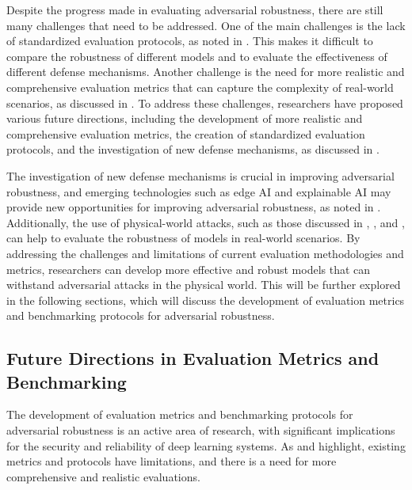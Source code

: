 \documentclass[11pt,a4paper]{article}
\begin{document}
Despite the progress made in evaluating adversarial robustness, there are still many challenges that need to be addressed. One of the main challenges is the lack of standardized evaluation protocols, as noted in \cite{doi:10.1007/978-3-030-58589-1_3}. This makes it difficult to compare the robustness of different models and to evaluate the effectiveness of different defense mechanisms. Another challenge is the need for more realistic and comprehensive evaluation metrics that can capture the complexity of real-world scenarios, as discussed in \cite{doi:10.1609/aaai.v35i2.16211}. To address these challenges, researchers have proposed various future directions, including the development of more realistic and comprehensive evaluation metrics, the creation of standardized evaluation protocols, and the investigation of new defense mechanisms, as discussed in \cite{arxiv:2007.04137}.

The investigation of new defense mechanisms is crucial in improving adversarial robustness, and emerging technologies such as edge AI and explainable AI may provide new opportunities for improving adversarial robustness, as noted in \cite{doi:10.1109/asp-dac47756.2020.9045584}. Additionally, the use of physical-world attacks, such as those discussed in \cite{doi:10.1109/lra.2022.3189783}, \cite{arxiv:2210.15291}, and \cite{doi:10.1109/vr51125.2022.00073}, can help to evaluate the robustness of models in real-world scenarios. By addressing the challenges and limitations of current evaluation methodologies and metrics, researchers can develop more effective and robust models that can withstand adversarial attacks in the physical world. This will be further explored in the following sections, which will discuss the development of evaluation metrics and benchmarking protocols for adversarial robustness.


\subsection{Future Directions in Evaluation Metrics and Benchmarking}


The development of evaluation metrics and benchmarking protocols for adversarial robustness is an active area of research, with significant implications for the security and reliability of deep learning systems. As \cite{doi:10.1145/3128572.3140444} and \cite{arxiv:1902.06705} highlight, existing metrics and protocols have limitations, and there is a need for more comprehensive and realistic evaluations. 
\end{document}
